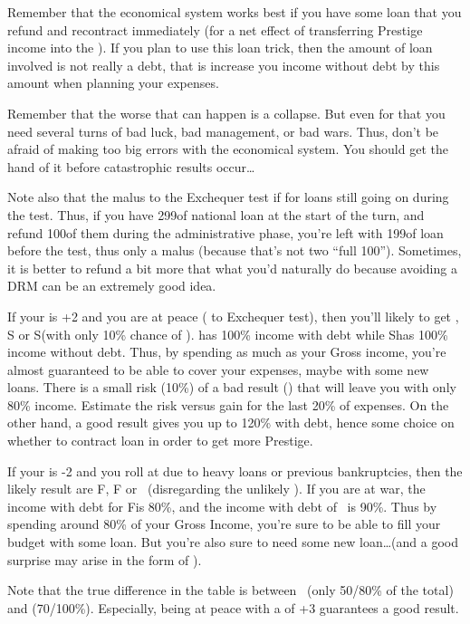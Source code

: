 \begin{playtip}
  \smallskip

  Remember that the economical system works best if you have some loan that
  you refund and recontract immediately (for a net effect of transferring
  Prestige income into the \RT). If you plan to use this loan trick, then the
  amount of loan involved is not really a debt, that is increase you income
  without debt by this amount when planning your expenses.

  \smallskip

  Remember that the worse that can happen is a \RT collapse. But even for that
  you need several turns of bad luck, bad management, or bad wars. Thus, don't
  be afraid of making too big errors with the economical system. You should
  get the hand of it before catastrophic results occur\ldots

  \smallskip

  Note also that the malus to the Exchequer test if for loans still going on
  during the test. Thus, if you have 299\ducats of national loan at the start
  of the turn, and refund 100\ducats of them during the administrative phase,
  you're left with 199\ducats of loan before the test, thus only a 
  malus (because that's not two ``full 100\ducats''). Sometimes, it is better
  to refund a bit more that what you'd naturally do because avoiding a
   DRM can be an extremely good idea.
\end{playtip}

\begin{exemple}
  If your \STAB is +2 and you are at peace ( to Exchequer test),
  then you'll likely to get \undemi\textetoile, S or S\textetoile (with only
  10\% chance of \undemi). \undemi\textetoile has 100\% income with debt while
  S\textetoile has 100\% income without debt. Thus, by spending as much as
  your Gross income, you're almost guaranteed to be able to cover your
  expenses, maybe with some new loans. There is a small risk (10\%) of a bad
  result (\undemi) that will leave you with only 80\% income. Estimate the
  risk versus gain for the last 20\% of expenses. On the other hand, a good
  result gives you up to 120\% with debt, hence some choice on whether to
  contract loan in order to get more Prestige.

  \smallskip

  If your \STAB is -2 and you roll at  due to heavy loans or
  previous bankruptcies, then the likely result are F\textetoile, F or
  \undemi\ (disregarding the unlikely \undemi\textetoile). If you are at war,
  the income with debt for F\textetoile is 80\%, and the income with debt of
  \undemi\ is 90\%. Thus by spending around 80\% of your Gross Income, you're
  sure to be able to fill your budget with some loan. But you're also sure to
  need some new loan\ldots (and a good surprise may arise in the form of
  \undemi\textetoile).

  \smallskip

  Note that the true difference in the table is between \undemi\ (only 50/80\%
  of the total) and \undemi\textetoile (70/100\%). Especially, being at peace
  with a \STAB of +3 guarantees a good result.
\end{exemple}

